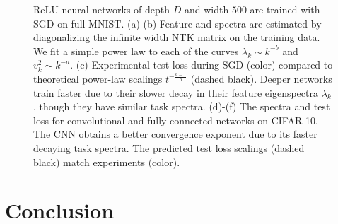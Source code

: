 \documentclass{article} %
\begin{document}
\begin{figure}[t]
    \caption{ReLU neural networks of depth $D$ and width $500$ are trained with SGD on full MNIST. (a)-(b) Feature and spectra are estimated by diagonalizing the infinite width NTK matrix on the training data. We fit a simple power law to each of the curves $\lambda_k \sim k^{-b}$ and $v_k^2 \sim k^{-a}$. (c) Experimental test loss during SGD (color) compared to theoretical power-law scalings $t^{-\frac{a-1}{b}}$ (dashed black). Deeper networks train faster due to their slower decay in their feature eigenspectra $\lambda_k$, though they have similar task spectra. (d)-(f) The spectra and test loss for convolutional and fully connected networks on CIFAR-10. The CNN obtains a better convergence exponent due to its faster decaying task spectra. The predicted test loss scalings (dashed black) match experiments (color). }
    \label{fig:NTK_fig}
\end{figure}




\section{Conclusion}\label{discussion}
\end{document}
